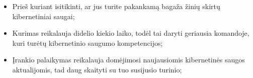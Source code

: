 \begin{itemize}
	\item Prieš kuriant isitikinti, ar jus turite pakankamą bagaža žinių skirtų kibernetiniai saugai;
	\item Kurimas reikalauja didelio kiekio laiko, todėl tai daryti geriausia komandoje, kuri turėtų kibernetinio saugumo kompetencijos;
	\item Įrankio palaikymas reikalauja domėjimosi naujausiomis kibernetinės saugos aktualijomis, tad daug skaityti su tuo susijusio turinio;
\end{itemize}
















